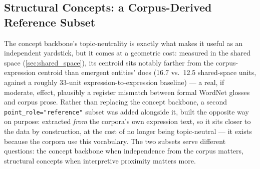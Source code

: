 \subsection{Structural Concepts: a Corpus-Derived Reference Subset}\label{sec:structural_concepts}
The concept backbone's topic-neutrality is exactly what makes it useful as an independent yardstick, but it comes at a geometric cost: measured in the shared space (\ref{sec:shared_space}), its centroid sits notably farther from the corpus-expression centroid than emergent entities' does (16.7 vs.\ 12.5 shared-space units, against a roughly 33-unit expression-to-expression baseline) — a real, if moderate, effect, plausibly a register mismatch between formal WordNet glosses and corpus prose. Rather than replacing the concept backbone, a second \texttt{point\_role="reference"} subset was added alongside it, built the opposite way on purpose: extracted \textit{from} the corpora's own expression text, so it sits closer to the data by construction, at the cost of no longer being topic-neutral — it exists because the corpora use this vocabulary. The two subsets serve different questions: the concept backbone when independence from the corpus matters, structural concepts when interpretive proximity matters more.

